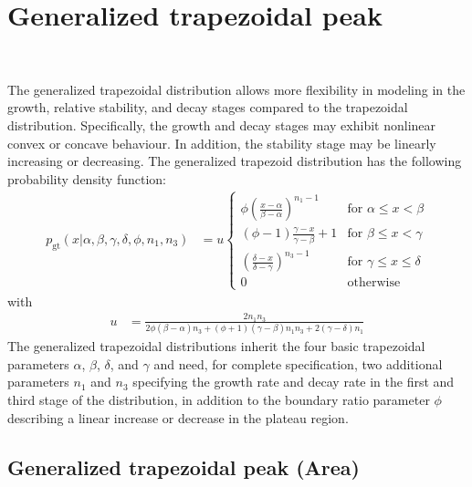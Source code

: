 \clearpage
\section{Generalized trapezoidal peak} ~\\
\label{sec:generalizedtrapezoidal}

 The generalized trapezoidal distribution allows more flexibility in modeling in the growth, relative stability, and decay stages compared to the trapezoidal distribution. Specifically, the growth and decay stages may exhibit nonlinear convex or concave behaviour. In addition, the stability stage may be linearly increasing or decreasing. The generalized trapezoid distribution \cite{Dorp2003} has the following probability density function:
\begin{align}
p_\mathrm{gt}(x|\alpha,\beta,\gamma,\delta,\phi,n_1,n_3) &=
 u
 \begin{cases}
 \phi \left(\frac{x-\alpha}{\beta-\alpha}\right)^{n_1-1}  &{\text{for }}\alpha\leq x<\beta\\
 \left(\phi-1\right)\frac{\gamma-x}{\gamma-\beta}+1  &{\text{for }}\beta\leq x<\gamma \\
 \left(\frac{\delta-x}{\delta-\gamma}\right)^{n_3-1}  &{\text{for }}\gamma\leq x\leq \delta \\
 {0} &{\text{otherwise }}
\end{cases}
\end{align}
with
\begin{align}
u &= \frac{2 n_1 n_3}{2 \phi (\beta-\alpha) n_3+(\phi+1)(\gamma-\beta)  n_1 n_3+2(\gamma-\delta) n_1}
\end{align}
The generalized trapezoidal distributions inherit the four basic trapezoidal parameters $\alpha$, $\beta$, $\delta$, and $\gamma$ and need, for complete specification, two additional parameters $n_1$ and $n_3$ specifying the
growth rate and decay rate in the first and third stage of the distribution, in
addition to the boundary ratio parameter $\phi$ describing a linear increase or decrease in the plateau region.

\subsection{Generalized trapezoidal peak (Area)} ~\\
\label{sec:generalizedtrapezoidalArea}



